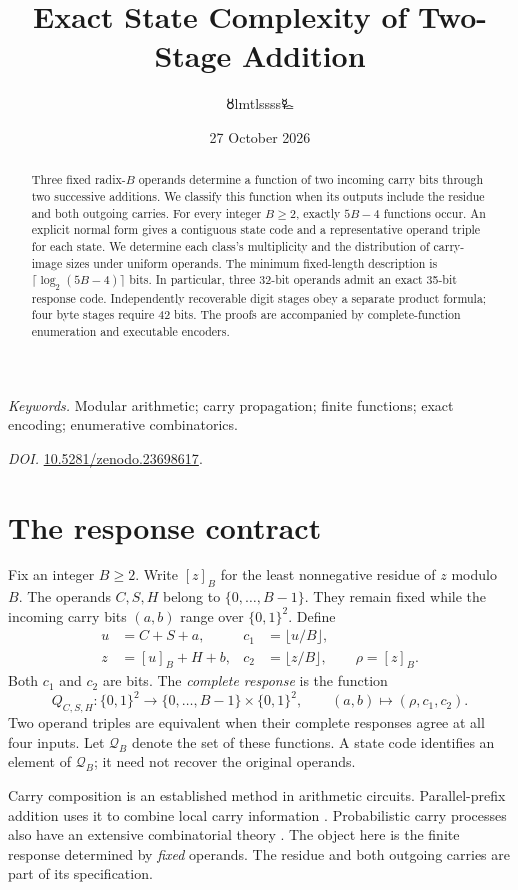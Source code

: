 \documentclass[11pt,a4paper]{article}
\title{\LARGE Exact State Complexity of Two-Stage Addition}
\author{{\authorsymbol 🜘}lmtlssss{\authorsymbol 🜐}}
\date{27 October 2026}
\theoremstyle{definition}\newtheorem{definition}[theorem]{Definition}
\newcommand{\res}[1]{[#1]_B}
\newcommand{\pairs}{\{0,1\}^2}
\newcommand{\Q}{\mathcal Q_B}
\begin{document}
\maketitle\thispagestyle{plain}
\begin{abstract}
Three fixed radix-$B$ operands determine a function of two incoming carry
bits through two successive additions. We classify this function when its
outputs include the residue and both outgoing carries. For every integer
$B\geq2$, exactly $5B-4$ functions occur. An explicit normal form gives a
contiguous state code and a representative operand triple for each state.
We determine each class's multiplicity and the distribution of carry-image
sizes under uniform operands. The minimum fixed-length description is
$\lceil\log_2(5B-4)\rceil$ bits. In particular, three 32-bit operands admit
an exact 35-bit response code. Independently recoverable digit stages obey
a separate product formula; four byte stages require 42 bits. The proofs
are accompanied by complete-function enumeration and executable encoders.
\end{abstract}
\noindent\textit{Keywords.} Modular arithmetic; carry propagation; finite functions;
exact encoding; enumerative combinatorics.\par
\noindent\textit{DOI.} \href{https://doi.org/10.5281/zenodo.23698617}{10.5281/zenodo.23698617}.

\section{The response contract}
Fix an integer $B\geq2$. Write $\res z$ for the least nonnegative residue
of $z$ modulo $B$. The operands $C,S,H$ belong to $\{0,\ldots,B-1\}$.
They remain fixed while the incoming carry bits $(a,b)$ range over $\pairs$.
Define
\begin{align}
 u&=C+S+a,& c_1&=\lfloor u/B\rfloor,\label{eq:first}\\
 z&=\res u+H+b,& c_2&=\lfloor z/B\rfloor,\qquad \rho=\res z.\label{eq:second}
\end{align}
Both $c_1$ and $c_2$ are bits. The \emph{complete response} is the function
\[
 Q_{C,S,H}:\pairs\longrightarrow\{0,\ldots,B-1\}\times\pairs,
 \qquad (a,b)\longmapsto(\rho,c_1,c_2).
\]
Two operand triples are equivalent when their complete responses agree
at all four inputs. Let $\Q$ denote the set of these functions.
A state code identifies an element of $\Q$; it need not recover the
original operands.

Carry composition is an established method in arithmetic circuits.
Parallel-prefix addition uses it to combine local carry information
\cite{brentkung}. Probabilistic carry processes also have an extensive
combinatorial theory \cite{diaconisfulman}. The object here is the finite
response determined by \emph{fixed} operands. The residue and both
outgoing carries are part of its specification.
\end{document}
